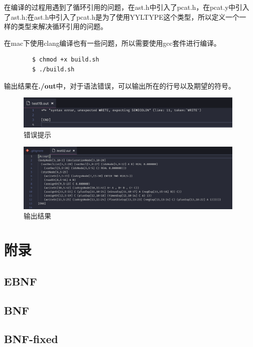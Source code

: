 \documentclass{article}
\begin{document}
	\begin{info}
		
		在编译的过程用遇到了循环引用的问题，在ast.h中引入了pcat.h，在pcat.y中引入了ast.h;在ast.h中引入了pcat.h是为了使用YYLTYPE这个类型，所以定义一个一样的类型来解决循环引用的问题。
		
		在mac下使用clang编译也有一些问题，所以需要使用gcc套件进行编译。
	\end{info}

	\begin{commandline}
		\begin{verbatim}
		$ chmod +x build.sh
		$ ./build.sh
		\end{verbatim}
	\end{commandline}

	输出结果在\textbf{./out}中，对于语法错误，可以输出所在的行号以及期望的符号。
	
	\begin{figure}[H]
		\centering
		\includegraphics[width=0.7\linewidth]{error}
		\caption{错误提示}
		\label{fig:error}
	\end{figure}

	\begin{figure}[H]
		\centering
		\includegraphics[width=0.7\linewidth]{correct}
		\caption{输出结果}
		\label{fig:correct}
	\end{figure}
	
	

\newpage
\section{附录}

\subsection{EBNF}
\begin{footnotesize}
	\linespread{1.0}
	
\end{footnotesize}


\newpage
\subsection{BNF}
\begin{footnotesize}
	\linespread{1.0}
	
\end{footnotesize}


\subsection{BNF-fixed}
\begin{footnotesize}
	\linespread{1.0}
	
\end{footnotesize}
\end{document}
